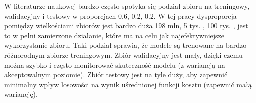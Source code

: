 W literaturze naukowej bardzo często spotyka się podział zbioru na treningowy, walidacyjny i testowy w proporcjach 0.6, 0.2, 0.2. W tej pracy dysproporcja pomiędzy wielkościami zbiorów jest bardzo duża 198 mln, 5 tys. , 100 tys. , jest to w pełni zamierzone działanie, które ma na celu jak najefektywniejsze wykorzystanie zbioru. Taki podział sprawia, że modele są trenowane na bardzo różnorodnym zbiorze treningowym. Zbiór walidacyjny jest mały, dzięki czemu można szybko i często monitorować skuteczność modelu (z wariancją na akceptowalnym poziomie). Zbiór testowy jest na tyle duży, aby zapewnić minimalny wpływ losowości na wynik uśrednionej funkcji kosztu (zapewnić małą wariancję).
